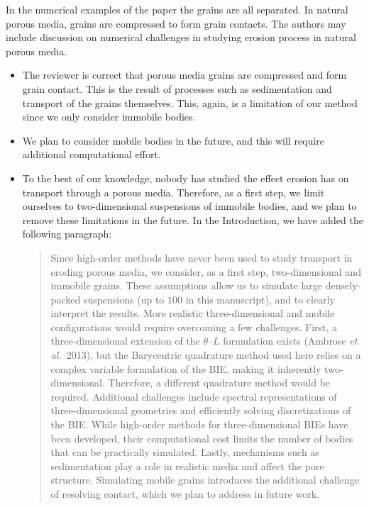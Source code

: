 \documentclass[11pt]{article}
\newcommand{\comment}[1]{{\color{blue} #1}}
\begin{document}
\noindent
\comment{In the numerical examples of the paper the grains are all
separated. In natural porous media, grains are compressed to form grain
contacts. The authors may include discussion on numerical challenges in
studying erosion process in natural porous media.}
\begin{itemize}
  \item The reviewer is correct that porous media grains are compressed
    and form grain contact. This is the result of processes such as
    sedimentation and transport of the grains themselves. This, again,
    is a limitation of our method since we only consider immobile
    bodies.

  \item We plan to consider mobile bodies in the future, and this will
    require additional computational effort.

  \item To the best of our knowledge, nobody has studied the effect
    erosion has on transport through a porous media. Therefore, as a
    first step, we limit ourselves to two-dimensional suspensions of
    immobile bodies, and we plan to remove these limitations in the
    future. In the Introduction, we have added the following paragraph:
    \begin{quotation}
      \noindent
      Since high-order methods have never been used to study transport
      in eroding porous media, we consider, as a first step,
      two-dimensional and immobile grains. These assumptions allow us to
      simulate large densely-packed suspensions (up to $100$ in this
      manuscript), and to clearly interpret the results. More realistic
      three-dimensional and mobile configurations would require
      overcoming a few challenges. First, a three-dimensional extension
      of the $\theta$--$L$ formulation exists (Ambrose {\em et
      al.}~2013), but the Barycentric quadrature method used here relies
      on a complex variable formulation of the BIE, making it inherently
      two-dimensional. Therefore, a different quadrature method would
      be required. Additional challenges include spectral
      representations of three-dimensional geometries and efficiently
      solving discretizations of the BIE. While high-order methods for
      three-dimensional BIEs have been developed, their computational
      cost limits the number of bodies that can be practically
      simulated. Lastly, mechanisms such as sedimentation play a role in
      realistic media and affect the pore structure. Simulating mobile
      grains introduces the additional challenge of resolving contact,
      which we plan to address in future work.
    \end{quotation}
\end{itemize}
\end{document}
